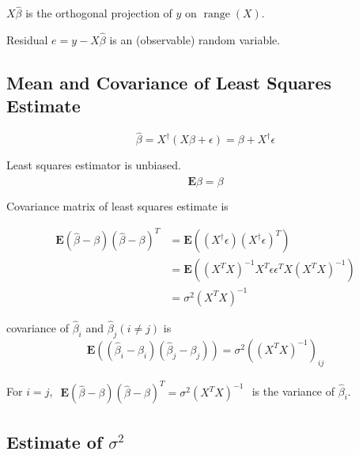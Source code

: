 $ X \hat{\beta} $ is the orthogonal projection of $ y $ on $ \operatorname{range}(X) $.

Residual $ e=y-X \hat{\beta} $ is an (observable) random variable.

\subsection{Mean and Covariance of Least Squares Estimate}

\begin{theorem}
    $$
\hat{\beta}=X^{\dagger}(X \beta+\epsilon)=\beta+X^{\dagger} \epsilon
$$
\end{theorem}

\begin{theorem}
    Least squares estimator is unbiased.
    $$ \mathbf{E} \hat{\beta}=\beta $$
\end{theorem}

\begin{theorem}
    Covariance matrix of least squares estimate is

$$
\begin{aligned}
\mathbf{E}(\hat{\beta}-\beta)(\hat{\beta}-\beta)^{T} &=\mathbf{E}\left(\left(X^{\dagger} \epsilon\right)\left(X^{\dagger} \epsilon\right)^{T}\right) \\
&=\mathbf{E}\left(\left(X^{T} X\right)^{-1} X^{T} \epsilon \epsilon^{T} X\left(X^{T} X\right)^{-1}\right) \\
&=\sigma^{2}\left(X^{T} X\right)^{-1}
\end{aligned}
$$
\end{theorem}

\begin{theorem}
    covariance of $ \hat{\beta}_{i} $ and $ \hat{\beta}_{j}(i \neq j) $ is
$$
\mathbf{E}\left(\left(\hat{\beta}_{i}-\beta_{i}\right)\left(\hat{\beta}_{j}-\beta_{j}\right)\right)=\sigma^{2}\left(\left(X^{T} X\right)^{-1}\right)_{i j}
$$
\end{theorem}

\begin{corollary}
    For $ i=j $, $
    \begin{aligned}
    \mathbf{E}(\hat{\beta}-\beta)(\hat{\beta}-\beta)^{T} =\sigma^{2}\left(X^{T} X\right)^{-1}
    \end{aligned}
    $ is the variance of $ \hat{\beta}_{i} $.
\end{corollary}



\subsection{Estimate of $ \sigma^{2} $}

